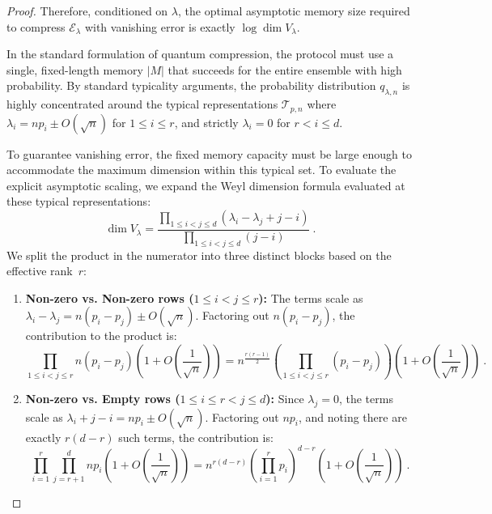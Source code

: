 \documentclass[11pt,letterpaper]{article}
\begin{document}
\begin{proof}
Therefore, conditioned on $\lambda$, the optimal asymptotic memory size required to compress $\mathcal{E}_\lambda$ with vanishing error is exactly $\log \dim V_\lambda$.

In the standard formulation of quantum compression, the protocol must use a single, fixed-length memory $|M|$ that succeeds for the entire ensemble with high probability. By standard typicality arguments, the probability distribution $q_{\lambda,n}$ is highly concentrated around the typical representations $\mathcal{T}_{p,n}$ where $\lambda_i = n p_i \pm O(\sqrt{n})$ for $1 \le i \le r$, and strictly $\lambda_i = 0$ for $r < i \le d$. 

To guarantee vanishing error, the fixed memory capacity must be large enough to accommodate the maximum dimension within this typical set. To evaluate the explicit asymptotic scaling, we expand the Weyl dimension formula evaluated at these typical representations:
\begin{equation}
    \dim V_\lambda = \frac{\prod_{1 \le i < j \le d} (\lambda_i - \lambda_j + j - i)}{\prod_{1 \le i < j \le d} (j - i)} \ .
\end{equation}
We split the product in the numerator into three distinct blocks based on the effective rank~$r$:
\begin{enumerate}
    \item \textbf{Non-zero vs. Non-zero rows ($1 \le i < j \le r$):} 
    The terms scale as $\lambda_i - \lambda_j = n(p_i - p_j) \pm O(\sqrt{n})$. Factoring out $n(p_i - p_j)$, the contribution to the product is:
    \begin{equation}
        \prod_{1 \le i < j \le r} n(p_i - p_j) \left( 1 + O\left(\frac{1}{\sqrt{n}}\right) \right) = n^{\frac{r(r-1)}{2}} \left( \prod_{1 \le i < j \le r} (p_i - p_j) \right) \left( 1 + O\left(\frac{1}{\sqrt{n}}\right) \right) \ .
    \end{equation}
    
    \item \textbf{Non-zero vs. Empty rows ($1 \le i \le r < j \le d$):}
    Since $\lambda_j = 0$, the terms scale as $\lambda_i + j - i = n p_i \pm O(\sqrt{n})$. Factoring out $n p_i$, and noting there are exactly $r(d-r)$ such terms, the contribution is:
    \begin{equation}
        \prod_{i=1}^r \prod_{j=r+1}^d n p_i \left( 1 + O\left(\frac{1}{\sqrt{n}}\right) \right) = n^{r(d-r)} \left( \prod_{i=1}^r p_i \right)^{d-r} \left( 1 + O\left(\frac{1}{\sqrt{n}}\right) \right) \ .
    \end{equation}
    

\end{enumerate}
\end{proof}
\end{document}
